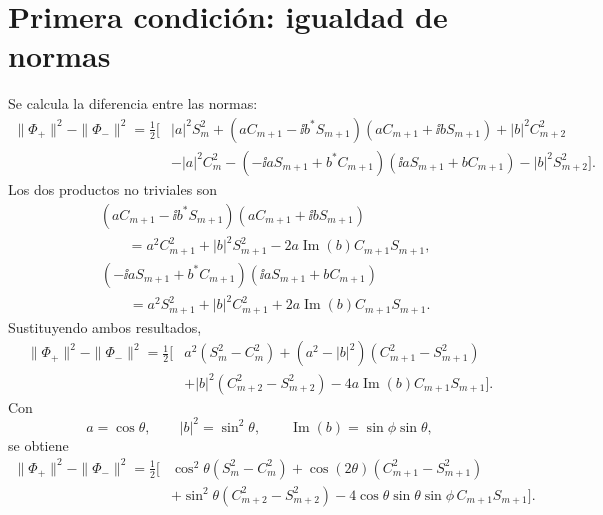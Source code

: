 \section{Primera condici\'on: igualdad de normas}

Se calcula la diferencia entre las normas:
\begin{equation}
\begin{aligned}
  \|\Phi_+\|^2-\|\Phi_-\|^2
  =\frac12\Big[&
  |a|^2S_m^2
  +(aC_{m+1}-\ii b^*S_{m+1})
   (aC_{m+1}+\ii bS_{m+1})
  +|b|^2C_{m+2}^2
  \\
  &-|a|^2C_m^2
  -(-\ii aS_{m+1}+b^*C_{m+1})
   (\ii aS_{m+1}+bC_{m+1})
  -|b|^2S_{m+2}^2
  \Big].
\end{aligned}
\end{equation}
Los dos productos no triviales son
\begin{equation}
\begin{aligned}
  &(aC_{m+1}-\ii b^*S_{m+1})
   (aC_{m+1}+\ii bS_{m+1})
  \\
  &\qquad=
  a^2C_{m+1}^2
  +|b|^2S_{m+1}^2
  -2a\operatorname{Im}(b)C_{m+1}S_{m+1},
\end{aligned}
\end{equation}
\begin{equation}
\begin{aligned}
  &(-\ii aS_{m+1}+b^*C_{m+1})
   (\ii aS_{m+1}+bC_{m+1})
  \\
  &\qquad=
  a^2S_{m+1}^2
  +|b|^2C_{m+1}^2
  +2a\operatorname{Im}(b)C_{m+1}S_{m+1}.
\end{aligned}
\end{equation}
Sustituyendo ambos resultados,
\begin{equation}
\begin{aligned}
  \|\Phi_+\|^2-\|\Phi_-\|^2
  =\frac12\Big[&
  a^2(S_m^2-C_m^2)
  +(a^2-|b|^2)(C_{m+1}^2-S_{m+1}^2)
  \\
  &+|b|^2(C_{m+2}^2-S_{m+2}^2)
  -4a\operatorname{Im}(b)C_{m+1}S_{m+1}
  \Big].
\end{aligned}
\end{equation}
Con
\begin{equation}
  a=\cos\theta,
  \qquad
  |b|^2=\sin^2\theta,
  \qquad
  \operatorname{Im}(b)=\sin\phi\sin\theta,
\end{equation}
se obtiene
\begin{equation}
\begin{aligned}
  \|\Phi_+\|^2-\|\Phi_-\|^2
  =\frac12\Big[&
  \cos^2\theta(S_m^2-C_m^2)
  +\cos(2\theta)(C_{m+1}^2-S_{m+1}^2)
  \\
  &+\sin^2\theta(C_{m+2}^2-S_{m+2}^2)
  -4\cos\theta\sin\theta\sin\phi\,
  C_{m+1}S_{m+1}
  \Big].
\end{aligned}
\end{equation}
